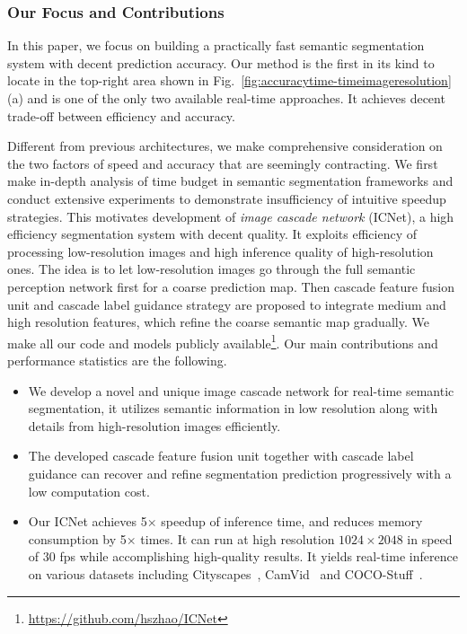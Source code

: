 \documentclass[runningheads]{llncs}
\begin{document}

\subsubsection{Our Focus and Contributions}
In this paper, we focus on building a practically fast semantic segmentation system with decent prediction accuracy. Our method is the first in its kind to locate in the top-right area shown in Fig.~\ref{fig:accuracytime-timeimageresolution}(a) and is one of the only two available real-time approaches. It achieves decent trade-off between efficiency and accuracy.

Different from previous architectures, we make comprehensive consideration on the two factors of speed and accuracy that are seemingly contracting. We first make in-depth analysis of time budget in semantic segmentation frameworks and conduct extensive experiments to demonstrate insufficiency of intuitive speedup strategies. This motivates development of \textit{image cascade network} (ICNet), a high efficiency segmentation system with decent quality. It exploits efficiency of processing low-resolution images and high inference quality of high-resolution ones. The idea is to let low-resolution images go through the full semantic perception network first for a coarse prediction map. Then cascade feature fusion unit and cascade label guidance strategy are proposed to integrate medium and high resolution features, which refine the coarse semantic map gradually. We make all our code and models publicly available\footnote{\href{https://github.com/hszhao/ICNet}{https://github.com/hszhao/ICNet}}. Our main contributions and performance statistics are the following.

\begin{itemize}
	\item We develop a novel and unique image cascade network for real-time semantic segmentation, it utilizes semantic information in low resolution along with details from high-resolution images efficiently. 
	\item The developed cascade feature fusion unit together with cascade label guidance can recover and refine segmentation prediction progressively with a low computation cost.
	\item Our ICNet achieves 5$\times$ speedup of inference time, and reduces memory consumption by 5$\times$ times. It can run at high resolution $1024\times 2048$ in speed of 30 fps while accomplishing high-quality results. It yields real-time inference on various datasets including Cityscapes~\cite{cordts2016cityscapes}, CamVid~\cite{BrostowFC09} and COCO-Stuff~\cite{caesar2016coco}.
\end{itemize}
\end{document}
